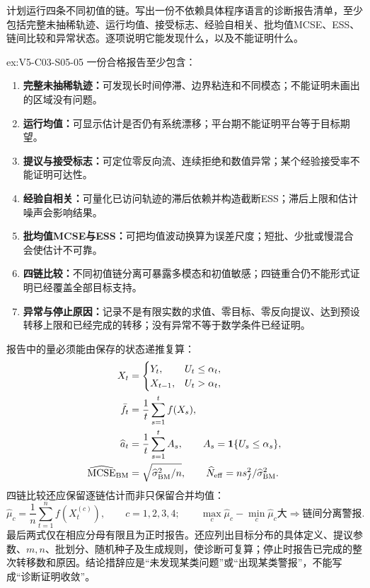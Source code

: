 \begin{SLChapterExercisePairSection}
\begin{exercise}\label{ex:V5-C03-S05-05}
计划运行四条不同初值的链。写出一份不依赖具体程序语言的诊断报告清单，至少包括完整未抽稀轨迹、运行均值、接受标志、经验自相关、批均值MCSE、ESS、链间比较和异常状态。逐项说明它能发现什么，以及不能证明什么。
\end{exercise}
\ifSLFullEdition
{}\label{sol:V5-C03-S05-05}
\begin{chapterexercisesolution}{ex:V5-C03-S05-05}
一份合格报告至少包含：
\begin{enumerate}[leftmargin=2.2em]
  \item \textbf{完整未抽稀轨迹：}可发现长时间停滞、边界粘连和不同模态；不能证明未画出的区域没有问题。
  \item \textbf{运行均值：}可显示估计是否仍有系统漂移；平台期不能证明平台等于目标期望。
  \item \textbf{提议与接受标志：}可定位零反向流、连续拒绝和数值异常；某个经验接受率不能证明可达性。
  \item \textbf{经验自相关：}可量化已访问轨迹的滞后依赖并构造截断ESS；滞后上限和估计噪声会影响结果。
  \item \textbf{批均值MCSE与ESS：}可把均值波动换算为误差尺度；短批、少批或慢混合会使估计不可靠。
  \item \textbf{四链比较：}不同初值链分离可暴露多模态和初值敏感；四链重合仍不能形式证明已经覆盖全部目标支持。
  \item \textbf{异常与停止原因：}记录不是有限实数的求值、零目标、零反向提议、达到预设转移上限和已经完成的转移；没有异常不等于数学条件已经证明。
\end{enumerate}
报告中的量必须能由保存的状态递推复算：
\[
\begin{aligned}
X_t&=\begin{cases}Y_t,&U_t\le\alpha_t,\\X_{t-1},&U_t>\alpha_t,\end{cases}\\
\bar f_t&=\frac1t\sum_{s=1}^tf(X_s),\\
\widehat a_t&=\frac1t\sum_{s=1}^tA_s,
\qquad A_s=\boldsymbol1\{U_s\le\alpha_s\},\\
\widehat{\operatorname{MCSE}}_{\rm BM}
&=\sqrt{\widehat\sigma_{\rm BM}^2/n},\qquad
\widehat N_{\rm eff}=n s_f^2/\widehat\sigma_{\rm BM}^2.
\end{aligned}
\]
四链比较还应保留逐链估计而非只保留合并均值：
\[
\widehat\mu_c=\frac1n\sum_{t=1}^nf(X_t^{(c)}),\qquad c=1,2,3,4;\qquad
\max_c\widehat\mu_c-\min_c\widehat\mu_c\text{大}\Longrightarrow\text{链间分离警报}.
\]
最后两式仅在相应分母有限且为正时报告。还应列出目标分布的具体定义、提议参数、$m,n$、批划分、随机种子及生成规则，使诊断可复算；停止时报告已完成的整次转移数和原因。结论措辞应是“未发现某类问题”或“出现某类警报”，不能写成“诊断证明收敛”。
\end{chapterexercisesolution}
\fi

\end{SLChapterExercisePairSection}

